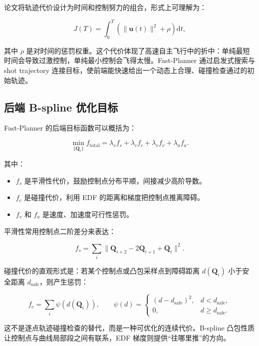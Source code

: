 \documentclass[UTF8,a4paper,12pt]{ctexart}
\newcommand{\ctrl}{\mathbf{Q}}
\newcommand{\dist}{d_{\mathrm{safe}}}
\begin{document}
论文将轨迹代价设计为时间和控制努力的组合，形式上可理解为：

\begin{equation}
  J(T)=\int_0^T \left(\|\mathbf{u}(t)\|^2+\rho\right)\mathrm{d}t,
\end{equation}

其中 $\rho$ 是对时间的惩罚权重。这个代价体现了高速自主飞行中的折中：单纯最短时间会导致过激控制，单纯最小控制会飞得太慢。Fast-Planner 通过启发式搜索与 shot trajectory 连接目标，使前端能快速给出一个动态上合理、碰撞检查通过的初始轨迹。

\subsection{后端 B-spline 优化目标}

Fast-Planner 的后端目标函数可以概括为：

\begin{equation}
  \min_{\{\ctrl_i\}} 
  f_{\mathrm{total}}
  =\lambda_s f_s+\lambda_c f_c+\lambda_v f_v+\lambda_a f_a .
\end{equation}

其中：

\begin{itemize}
  \item $f_s$ 是平滑性代价，鼓励控制点分布平顺，间接减少高阶导数。
  \item $f_c$ 是碰撞代价，利用 EDF 的距离和梯度把控制点推离障碍。
  \item $f_v$ 和 $f_a$ 是速度、加速度可行性惩罚。
\end{itemize}

平滑性常用控制点二阶差分来表达：

\begin{equation}
  f_s=\sum_i \|\ctrl_{i+2}-2\ctrl_{i+1}+\ctrl_i\|^2.
\end{equation}

碰撞代价的直观形式是：若某个控制点或凸包采样点到障碍距离 $d(\ctrl_i)$ 小于安全距离 $\dist$，则产生惩罚：

\begin{equation}
  f_c=\sum_i \psi(d(\ctrl_i)), \qquad
  \psi(d)=
  \begin{cases}
  (d-\dist)^2, & d<\dist,\\
  0, & d\ge \dist.
  \end{cases}
\end{equation}

这不是逐点轨迹碰撞检查的替代，而是一种可优化的连续代价。B-spline 凸包性质让控制点与曲线局部段之间有联系，EDF 梯度则提供“往哪里推”的方向。
\end{document}
